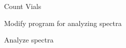 \documentclass[idxtotoc,hyperref,openany,oneside]{labbook} %
\newcommand{\HRule}{\rule{\linewidth}{0.5mm}} %
\newcommand{\cmark}{\ding{51}}%
\newcommand{\xmark}{\ding{55}}%
\newcommand{\done}{\rlap{$\square$}{\raisebox{2pt}{\large\hspace{1pt}\cmark}}%
  \hspace{-2.5pt}}
\newcommand{\wontfix}{\rlap{$\square$}{\large\hspace{1pt}\xmark}}
\begin{document}
\begin{todolist}
\item{Count Vials}
\item{Modify program for analyzing spectra}
\item{Analyze spectra}
\end{todolist}






\end{document}
